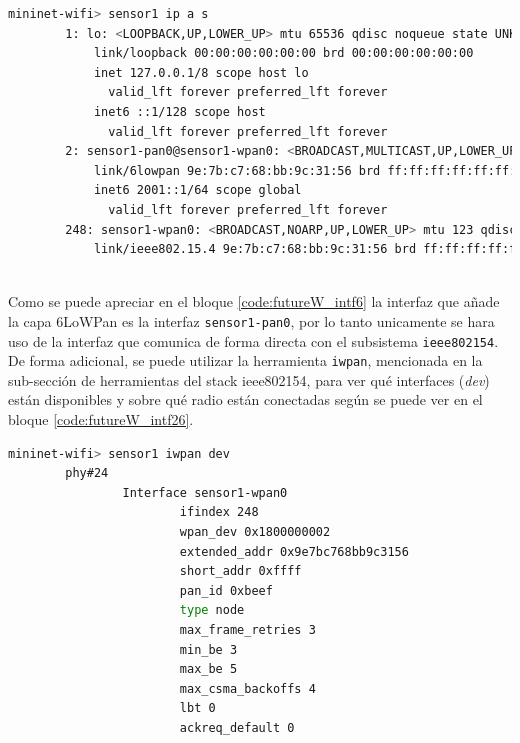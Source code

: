 \begin{lstlisting}[language= bash, style=Consola, caption={Obtención de interfaz 802.15.4},label=code:futureW_intf6]
    mininet-wifi> sensor1 ip a s
        1: lo: <LOOPBACK,UP,LOWER_UP> mtu 65536 qdisc noqueue state UNKNOWN group default qlen 1000
            link/loopback 00:00:00:00:00:00 brd 00:00:00:00:00:00
            inet 127.0.0.1/8 scope host lo
              valid_lft forever preferred_lft forever
            inet6 ::1/128 scope host
              valid_lft forever preferred_lft forever
        2: sensor1-pan0@sensor1-wpan0: <BROADCAST,MULTICAST,UP,LOWER_UP> mtu 1280 qdisc noqueue state UNKNOWN group default qlen 1000
            link/6lowpan 9e:7b:c7:68:bb:9c:31:56 brd ff:ff:ff:ff:ff:ff:ff:ff
            inet6 2001::1/64 scope global
              valid_lft forever preferred_lft forever
        248: sensor1-wpan0: <BROADCAST,NOARP,UP,LOWER_UP> mtu 123 qdisc fq_codel state UNKNOWN group default qlen 300
            link/ieee802.15.4 9e:7b:c7:68:bb:9c:31:56 brd ff:ff:ff:ff:ff:ff:ff:ff
    

\end{lstlisting}

\vspace{0.5cm}
Como se puede apreciar en el bloque \ref{code:futureW_intf6} la interfaz que añade la capa 6LoWPan es la interfaz \texttt{sensor1-pan0}, por lo tanto unicamente se hara uso de la interfaz que comunica de forma directa con el subsistema \texttt{ieee802154}. De forma adicional, se puede utilizar la herramienta \texttt{iwpan}, mencionada en la sub-sección de herramientas del stack ieee802154, para ver qué interfaces (\textit{dev}) están disponibles y sobre qué radio están conectadas según se puede ver en el bloque \ref{code:futureW_intf26}.

\begin{lstlisting}[language= bash, style=Consola, caption={Obtención de interfaz 802.15.4 haciendo uso de la herramienta iwpan},label=code:futureW_intf26]
    mininet-wifi> sensor1 iwpan dev
        phy#24
                Interface sensor1-wpan0
                        ifindex 248
                        wpan_dev 0x1800000002
                        extended_addr 0x9e7bc768bb9c3156
                        short_addr 0xffff
                        pan_id 0xbeef
                        type node
                        max_frame_retries 3
                        min_be 3
                        max_be 5
                        max_csma_backoffs 4
                        lbt 0
                        ackreq_default 0
        

\end{lstlisting}


